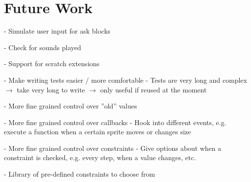 
\chapter{Future Work}

- Simulate user input for ask blocks

- Check for sounds played

- Support for scratch extensions

- Make writing tests easier / more comfortable
    - Tests are very long and complex
    $\rightarrow$ take very long to write $\rightarrow$ only useful if reused at the moment

- More fine grained control over ''old'' values

- More fine grained control over callbacks
    - Hook into different events, e.g. execute a function when a certain sprite moves or changes size

- More fine grained control over constraints
    - Give options about when a constraint is checked, e.g. every step, when a value changes, etc.

- Library of pre-defined constraints to choose from
